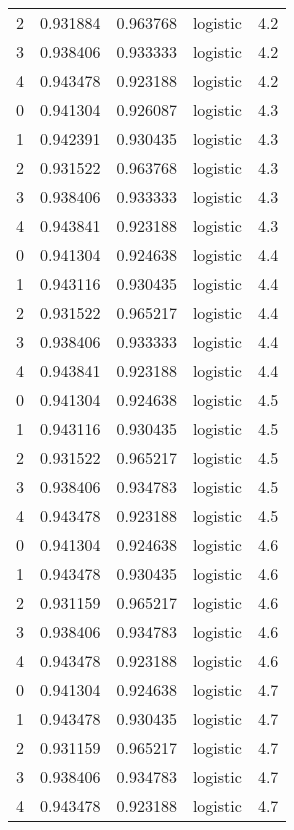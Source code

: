 \begin{tabular}{rrrlr}
     2 & 0.931884 & 0.963768 & logistic &        4.2 \\
     3 & 0.938406 & 0.933333 & logistic &        4.2 \\
     4 & 0.943478 & 0.923188 & logistic &        4.2 \\
     0 & 0.941304 & 0.926087 & logistic &        4.3 \\
     1 & 0.942391 & 0.930435 & logistic &        4.3 \\
     2 & 0.931522 & 0.963768 & logistic &        4.3 \\
     3 & 0.938406 & 0.933333 & logistic &        4.3 \\
     4 & 0.943841 & 0.923188 & logistic &        4.3 \\
     0 & 0.941304 & 0.924638 & logistic &        4.4 \\
     1 & 0.943116 & 0.930435 & logistic &        4.4 \\
     2 & 0.931522 & 0.965217 & logistic &        4.4 \\
     3 & 0.938406 & 0.933333 & logistic &        4.4 \\
     4 & 0.943841 & 0.923188 & logistic &        4.4 \\
     0 & 0.941304 & 0.924638 & logistic &        4.5 \\
     1 & 0.943116 & 0.930435 & logistic &        4.5 \\
     2 & 0.931522 & 0.965217 & logistic &        4.5 \\
     3 & 0.938406 & 0.934783 & logistic &        4.5 \\
     4 & 0.943478 & 0.923188 & logistic &        4.5 \\
     0 & 0.941304 & 0.924638 & logistic &        4.6 \\
     1 & 0.943478 & 0.930435 & logistic &        4.6 \\
     2 & 0.931159 & 0.965217 & logistic &        4.6 \\
     3 & 0.938406 & 0.934783 & logistic &        4.6 \\
     4 & 0.943478 & 0.923188 & logistic &        4.6 \\
     0 & 0.941304 & 0.924638 & logistic &        4.7 \\
     1 & 0.943478 & 0.930435 & logistic &        4.7 \\
     2 & 0.931159 & 0.965217 & logistic &        4.7 \\
     3 & 0.938406 & 0.934783 & logistic &        4.7 \\
     4 & 0.943478 & 0.923188 & logistic &        4.7 \\

\end{tabular}

